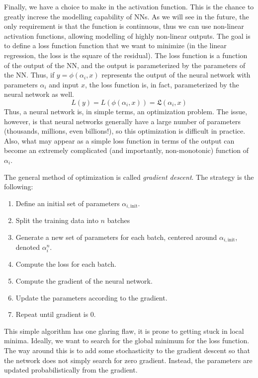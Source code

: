 Finally, we have a choice to make in the activation function. This is the chance to greatly increse the modelling capability of NNs. As we will see in the future, the only requirement is that the function is continuous, thus we can use non-linear activation functions, allowing modelling of highly non-linear outputs. The goal is to define a loss function function that we want to minimize (in the linear regression, the loss is the square of the residual). The loss function is a function of the output of the NN, and the output is parameterized by the parameters of the NN. Thus, if $y=\phi(\alpha_i,x)$ represents the output of the neural network with parameters $\alpha_i$ and input $x$, the loss function is, in fact, parameterized by the neural network as well.
\begin{equation}
	L(y) = L(\phi(\alpha_i,x)) = \mathfrak{L}(\alpha_i,x)
\end{equation}
Thus, a neural network is, in simple terms, an optimization problem. The issue, however, is that neural networks generally have a large number of parameters (thousands, millions, even billions!), so this optimization is difficult in practice. Also, what may appear as a simple loss function in terms of the output can become an extremely complicated (and importantly, non-monotonic) function of $\alpha_i$.

The general method of optimization is called \textit{gradient descent}. The strategy is the following:
\begin{enumerate}
	\item Define an initial set of parameters $\alpha_{i,\mathrm{init}}$.
	\item Split the training data into $n$ batches
	\item Generate a new set of parameters for each batch, centered around $\alpha_{i,\mathrm{init}}$, denoted $\alpha^{n}_{i}$.
	\item Compute the loss for each batch.
	\item Compute the gradient of the neural network.
	\item Update the parameters according to the gradient.
	\item Repeat until gradient is 0.
\end{enumerate}
This simple algorithm has one glaring flaw, it is prone to getting stuck in local minima. Ideally, we want to search for the global minimum for the loss function. The way around this is to add some stochasticity to the gradient descent so that the network does not simply search for zero gradient. Instead, the parameters are updated probabilistically from the gradient.

